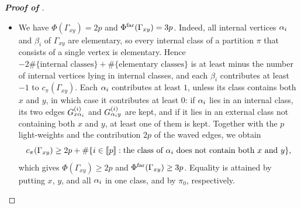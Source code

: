 \begin{proof}[\bf Proof of ]
\begin{itemize}
\item[(b)] We have $\Phi(\Gamma_{xy})=2p$ and $\Phi^{\rm far}(\Gamma_{xy})=3p$. Indeed, all internal vertices $\alpha_i$ and $\beta_i$ of $\Gamma_{xy}$ are elementary, so every internal class of a partition $\pi$ that consists of a single vertex is elementary. Hence $-2\#\{\text{internal classes}\}+\#\{\text{elementary classes}\}$ is at least minus the number of internal vertices lying in internal classes, and each $\beta_i$ contributes at least $-1$ to $c_\pi(\Gamma_{xy})$. Each $\alpha_i$ contributes at least $1$, unless its class contains both $x$ and $y$, in which case it contributes at least $0$: if $\alpha_i$ lies in an internal class, its two edges $G^{(i)}_{x\alpha_i}$ and $G^{(i)}_{\alpha_i y}$ are kept, and if it lies in an external class not containing both $x$ and $y$, at least one of them is kept. Together with the $p$ light-weights and the contribution $2p$ of the waved edges, we obtain
\[ c_\pi(\Gamma_{xy})\ge 2p+\#\{i\in\llbracket{p}\rrbracket:\text{the class of $\alpha_i$ does not contain both $x$ and $y$}\}, \]
which gives $\Phi(\Gamma_{xy})\ge 2p$ and $\Phi^{\rm far}(\Gamma_{xy})\ge 3p$. Equality is attained by putting $x$, $y$, and all $\alpha_i$ in one class, and by $\pi_0$, respectively.


\end{itemize}
\end{proof}
